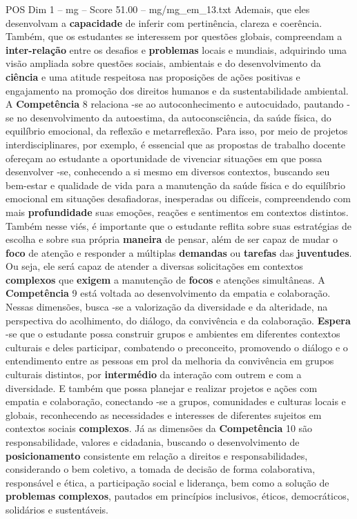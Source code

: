\begin{textsample}{POS Dim 1 – mg – Score 51.00 – mg/mg\_em\_13.txt}
Ademais, que eles desenvolvam a \textbf{capacidade} de inferir com pertinência, clareza e coerência.
Também, que os estudantes se interessem por questões globais, compreendam a \textbf{inter-relação} entre os desafios e \textbf{problemas} locais e mundiais, adquirindo uma visão ampliada sobre questões sociais, ambientais e do desenvolvimento da \textbf{ciência} e uma atitude respeitosa nas proposições de ações positivas e engajamento na promoção dos direitos humanos e da sustentabilidade ambiental.
A \textbf{Competência} 8 relaciona -se ao autoconhecimento e autocuidado, pautando -se no desenvolvimento da autoestima, da autoconsciência, da saúde física, do equilíbrio emocional, da reflexão e metarreflexão.
Para isso, por meio de projetos interdisciplinares, por exemplo, é essencial que as propostas de trabalho docente ofereçam ao estudante a oportunidade de vivenciar situações em que possa desenvolver -se, conhecendo a si mesmo em diversos contextos, buscando seu bem-estar e qualidade de vida para a manutenção da saúde física e do equilíbrio emocional em situações desafiadoras, inesperadas ou difíceis, compreendendo com mais \textbf{profundidade} suas emoções, reações e sentimentos em contextos distintos.
Também nesse viés, é importante que o estudante reflita sobre suas estratégias de escolha e sobre sua própria \textbf{maneira} de pensar, além de ser capaz de mudar o \textbf{foco} de atenção e responder a múltiplas \textbf{demandas} ou \textbf{tarefas} das \textbf{juventudes}.
Ou seja, ele será capaz de atender a diversas solicitações em contextos \textbf{complexos} que \textbf{exigem} a manutenção de \textbf{focos} e atenções simultâneas.
A \textbf{Competência} 9 está voltada ao desenvolvimento da empatia e colaboração.
Nessas dimensões, busca -se a valorização da diversidade e da alteridade, na perspectiva do acolhimento, do diálogo, da convivência e da colaboração. \textbf{Espera} -se que o estudante possa construir grupos e ambientes em diferentes contextos culturais e deles participar, combatendo o preconceito, promovendo o diálogo e o entendimento entre as pessoas em prol da melhoria da convivência em grupos culturais distintos, por \textbf{intermédio} da interação com outrem e com a diversidade.
E também que possa planejar e realizar projetos e ações com empatia e colaboração, conectando -se a grupos, comunidades e culturas locais e globais, reconhecendo as necessidades e interesses de diferentes sujeitos em contextos sociais \textbf{complexos}.
Já as dimensões da \textbf{Competência} 10 são responsabilidade, valores e cidadania, buscando o desenvolvimento de \textbf{posicionamento} consistente em relação a direitos e responsabilidades, considerando o bem coletivo, a tomada de decisão de forma colaborativa, responsável e ética, a participação social e liderança, bem como a solução de \textbf{problemas} \textbf{complexos}, pautados em princípios inclusivos, éticos, democráticos, solidários e sustentáveis.

\end{textsample}
